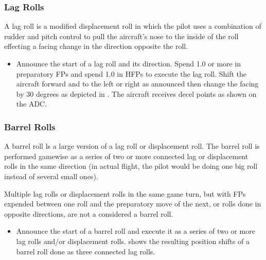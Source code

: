 \subsubsection{Lag Rolls}



A lag roll is a modified displacement roll in which the pilot uses a combination of rudder and pitch control to pull the aircraft's nose to the inside of the roll effecting a facing change in the direction opposite the roll.

\begin{itemize}
    \item{} Announce the start of a lag roll and its direction. Spend 1.0 or more in preparatory FPs and spend 1.0 in HFPs to execute the lag roll. Shift the aircraft forward and to the left or right as announced then change the facing by 30 degrees as depicted in  . The aircraft receives decel points as shown on the ADC.
\end{itemize}

\subsubsection{Barrel Rolls}


A barrel roll ls a large version of a lag roll or displacement roll. The barrel roll is performed gamewise as a series of two or more connected lag or displacement rolls in the same direction (in actual flight, the pilot would be doing one big roll instead of several small ones).

Multiple lag rolls or displacement rolls in the same game turn, but with FPs expended between one roll and the preparatory move of the next, or rolls done in opposite directions, are not a considered a barrel roll.

\begin{itemize}
    \item{} Announce the start of a barrel roll and execute it as a series of two or more lag rolls and/or displacement rolls.  shows the resulting position shifts of a barrel roll done as three connected lag rolls.
\end{itemize}


